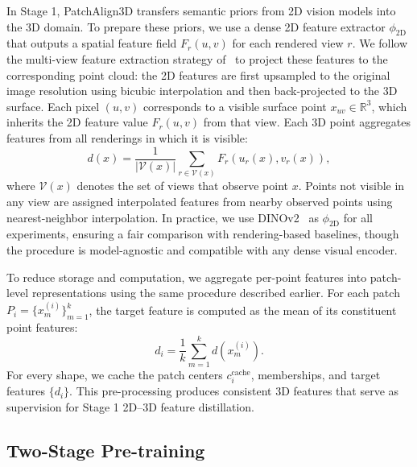 In Stage 1, PatchAlign3D transfers semantic priors from 2D vision models into the 3D domain. To prepare these priors, we use a dense 2D feature extractor $\phi_{\text{2D}}$ that outputs a spatial feature field
$F_r(u,v)$ for each rendered view $r$.
We follow the multi-view feature extraction strategy of~\cite{garosi20253d} to project these features to the corresponding point cloud:
the 2D features are first upsampled to the original image resolution using bicubic interpolation and then back-projected to the 3D surface.
Each pixel $(u,v)$ corresponds to a visible surface point $x_{uv} \in \mathbb{R}^3$,
which inherits the 2D feature value $F_r(u,v)$ from that view.
Each 3D point aggregates features from all renderings in which it is visible:
\begin{equation}
    d(x) = \frac{1}{|\mathcal{V}(x)|}
\sum_{r \in \mathcal{V}(x)} F_r(u_r(x), v_r(x)),
\end{equation}
where $\mathcal{V}(x)$ denotes the set of views that observe point $x$.
Points not visible in any view are assigned interpolated features from nearby observed points using nearest-neighbor interpolation.
In practice, we use DINOv2~\cite{oquab2023dinov2} as $\phi_{\text{2D}}$ for all experiments,
ensuring a fair comparison with rendering-based baselines, though the procedure is model-agnostic
and compatible with any dense visual encoder.

To reduce storage and computation, we aggregate per-point features into patch-level
representations using the same procedure described earlier.
For each patch $P_i = \{x_m^{(i)}\}_{m=1}^{k}$, the target feature is computed as the mean
of its constituent point features:
\begin{equation}
d_i = \frac{1}{k} \sum_{m=1}^{k} d(x_m^{(i)}).
\end{equation}
For every shape, we cache the patch centers $c_i^{\text{cache}}$, memberships, and target features $\{d_i\}$.
This pre-processing produces consistent 3D features that serve as supervision for Stage 1 2D–3D feature distillation.

\subsection{Two-Stage  Pre-training}

